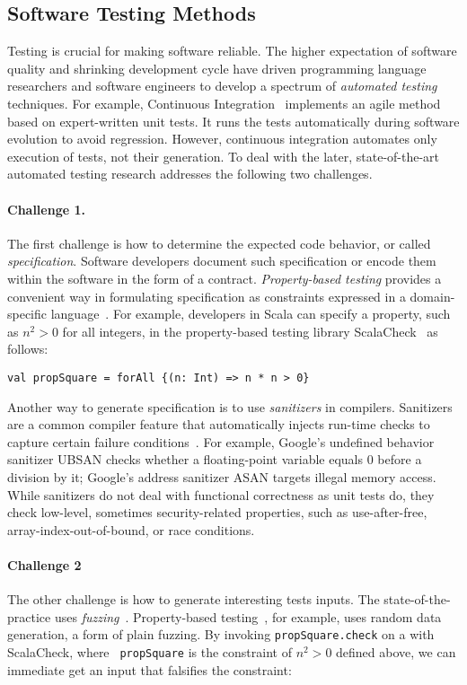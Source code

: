 \documentclass[fleqn,12pt]{article}
\begin{document}
\subsection{Software Testing Methods}
Testing is crucial for making software reliable. The higher
expectation of software quality and shrinking development cycle have
driven programming language researchers and software engineers to
develop a spectrum of \emph{automated testing} techniques. For example,
Continuous Integration~\cite{duvall2007continuous} implements an agile
method based on expert-written unit tests. It runs the tests
automatically during software evolution to avoid regression.  However, continuous integration automates only execution
of tests, not their generation. To deal with the later,
state-of-the-art automated testing research addresses
the following two challenges.


\paragraph{Challenge 1.}
The first challenge is how to determine the expected code behavior, or
called \emph{specification}.  Software developers document such
specification or encode them within the software in the form of a
contract. \emph{Property-based testing} provides a convenient way in
formulating specification as constraints expressed in a
domain-specific language~\cite{DBLP:conf/icfp/ClaessenH00}.  For
example, developers in Scala can specify a property, such as $n^2>0$
for all integers, in the property-based testing library
ScalaCheck~\cite{nilsson2014scalacheck} as follows:
\begin{lstlisting}[numbers=none]
val propSquare = forAll {(n: Int) => n * n > 0}
\end{lstlisting}

Another way to generate specification is to use \emph{sanitizers} in
compilers. Sanitizers are a common compiler feature that automatically
injects run-time checks to capture certain failure
conditions~\cite{DBLP:conf/usenix/SerebryanyBPV12}. For example,
Google's undefined behavior sanitizer UBSAN checks whether a
floating-point variable equals 0 before a division by it; Google's
address sanitizer ASAN targets illegal memory access. While sanitizers
do not deal with functional correctness as unit tests do, they check
low-level, sometimes security-related properties, such as
use-after-free, array-index-out-of-bound, or race conditions.

\paragraph{Challenge 2}
The other challenge is how to generate interesting tests inputs.  The
state-of-the-practice  uses
\emph{fuzzing}~\cite{takanen2018fuzzing}. Property-based testing~\cite{DBLP:conf/icfp/ClaessenH00},
for example, uses random data generation, a form of plain fuzzing.  By
invoking {\tt propSquare.check} on a with ScalaCheck, where {\tt
  propSquare} is the constraint of $n^2>0$ defined above, we can
immediate get an input that falsifies the constraint:
\end{document}
